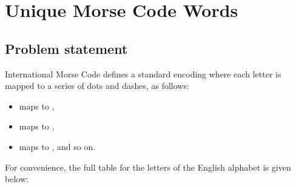 \documentclass[letterpaper,12pt,english]{book}
\begin{document}
\sphinxstepscope


\section{Unique Morse Code Words}
\label{\detokenize{String/08_STR_804_Unique_Morse_Code_Words:unique-morse-code-words}}\label{\detokenize{String/08_STR_804_Unique_Morse_Code_Words::doc}}

\subsection{Problem statement\sphinxfootnotemark[36]}
\label{\detokenize{String/08_STR_804_Unique_Morse_Code_Words:problem-statement}}%
\begin{footnotetext}[36]\sphinxAtStartFootnote
{}
%
\end{footnotetext}\ignorespaces 
\sphinxAtStartPar
International Morse Code defines a standard encoding where each letter is mapped to a series of dots and dashes, as follows:
\begin{itemize}
\item {} 
\sphinxAtStartPar
{} maps to ,

\item {} 
\sphinxAtStartPar
{} maps to ,

\item {} 
\sphinxAtStartPar
{} maps to , and so on.

\end{itemize}

\sphinxAtStartPar
For convenience, the full table for the  letters of the English alphabet is given below:

\begin{sphinxVerbatim}
\end{sphinxVerbatim}
\end{document}
